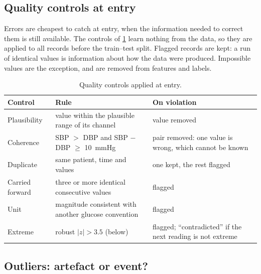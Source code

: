 \subsection{Quality controls at entry}\label{sec:quality}\label{sec:ingestion}

Errors are cheapest to catch at entry, when the information needed to correct them is still available. The controls of \cref{tab:quality-controls} learn nothing from the data, so they are applied to all records before the train--test split. Flagged records are kept: a run of identical values is information about how the data were produced. Impossible values are the exception, and are removed from features and labels.

\begin{table}[htbp]
\centering\footnotesize
\caption{Quality controls applied at entry.}\label{tab:quality-controls}
\begin{tabularx}{\textwidth}{@{}>{\raggedright\arraybackslash}p{2.6cm} X >{\raggedright\arraybackslash}p{4.0cm}@{}}
\toprule
\textbf{Control} & \textbf{Rule} & \textbf{On violation} \\
\midrule
Plausibility & value within the plausible range of its channel & value removed \\
Coherence & SBP $>$ DBP and SBP $-$ DBP $\geq$ 10~mmHg & pair removed: one value is wrong, which cannot be known \\
Duplicate & same patient, time and values & one kept, the rest flagged \\
Carried forward & three or more identical consecutive values & flagged \\
Unit & magnitude consistent with another glucose convention & flagged \\
Extreme & robust $\lvert z\rvert > 3.5$ (below) & flagged; ``contradicted'' if the next reading is not extreme \\
\bottomrule
\end{tabularx}
\end{table}

\subsection{Outliers: artefact or event?}\label{sec:outliers}\label{sec:mad-shrinkage}

